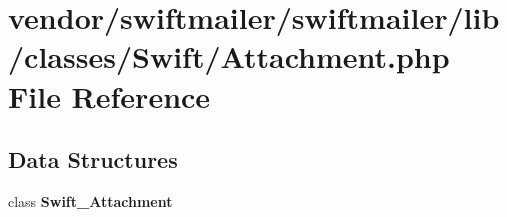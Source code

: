 \section{vendor/swiftmailer/swiftmailer/lib/classes/\+Swift/\+Attachment.php File Reference}
\label{_attachment_8php}
\subsection*{Data Structures}
\begin{DoxyCompactItemize}
\item 
class {\bf Swift\+\_\+\+Attachment}
\end{DoxyCompactItemize}
